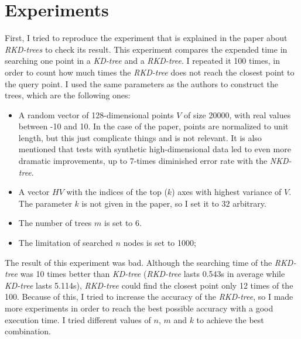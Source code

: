 \section{Experiments}
First, I tried to reproduce the experiment that is explained in the paper about \textit{RKD-trees} to check its result. This experiment compares the  expended time in searching one point in a \textit{KD-tree} and a \textit{RKD-tree}. I repeated it 100 times, in order to count how much times the \textit{RKD-tree} does not reach the closest point to the query point. I used the same parameters as the authors to construct the trees, which are the following ones:
\begin{itemize}
    \item A random vector of 128-dimensional points $V$ of size 20000, with real values between -10 and 10. In the case of the paper, points are normalized to unit length, but this just complicate things and is not relevant. It is also mentioned that tests with synthetic high-dimensional data led to even more dramatic improvements, up to 7-times diminished error rate with the \textit{NKD-tree}.
    \item A vector $HV$ with the indices of the top ($k$) axes with highest variance of $V$. The parameter $k$ is not given in the paper, so I set it to $32$ arbitrary.
    \item The number of trees $m$ is set to 6.
    \item The limitation of searched $n$ nodes is set to 1000;
\end{itemize}

The result of this experiment was bad. Although the searching time of the \textit{RKD-tree} was 10 times better than \textit{KD-tree} (\textit{RKD-tree} lasts 0.543s in average while \textit{KD-tree} lasts 5.114s), \textit{RKD-tree} could find the closest point only 12 times of the 100. Because of this, I tried to increase the accuracy of the \textit{RKD-tree}, so I made more experiments in order to reach the best possible accuracy with a good execution time. I tried different values of $n$, $m$ and $k$ to achieve the best combination.
